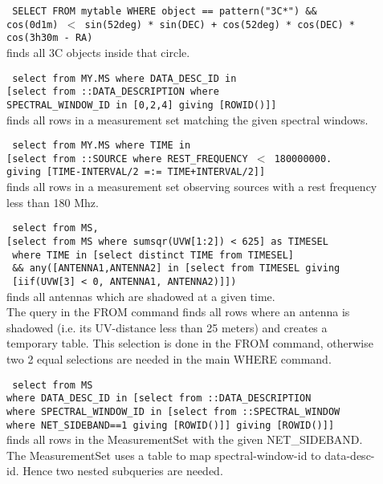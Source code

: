 \begin{description}
  \item[] \texttt{ SELECT FROM mytable WHERE object == pattern("3C*") \&\&}
     \\\texttt{cos(0d1m) $<$ sin(52deg) * sin(DEC) + cos(52deg) *
        cos(DEC) * cos(3h30m - RA) }
     \\finds all 3C objects inside that circle.

  \item[] \texttt{ select from MY.MS where DATA\_DESC\_ID in}
      \\\texttt{[select from ::DATA\_DESCRIPTION where}
      \\\texttt{SPECTRAL\_WINDOW\_ID in [0,2,4] giving [ROWID()]]}
      \\finds all rows in a measurement set matching the given
      spectral windows.

  \item[] \texttt{ select from MY.MS where TIME in}
      \\\texttt{[select from ::SOURCE where REST\_FREQUENCY $<$ 180000000.}
      \\\texttt{giving [TIME-INTERVAL/2 =:= TIME+INTERVAL/2]]}
      \\finds all rows in a measurement set observing sources with a
      rest frequency less than 180 Mhz.

  \item[] \texttt{ select from MS,}
      \\\texttt{[select from MS where sumsqr(UVW[1:2]) < 625] as TIMESEL}
      \\\texttt{ where TIME in [select distinct TIME from TIMESEL]}
      \\\texttt{   \&\& any([ANTENNA1,ANTENNA2] in [select from TIMESEL giving}
      \\\texttt{                      [iif(UVW[3] < 0, ANTENNA1, ANTENNA2)]])}
      \\finds all antennas which are shadowed at a given time.
      \\The query in the FROM command finds all rows where an antenna
      is shadowed (i.e. its UV-distance less than 25 meters) and
      creates a temporary table. This selection is done in the FROM
      command, otherwise two 2 equal selections are needed in the main
      WHERE command.
      
  \item[] \texttt{ select from MS}
      \\\texttt{where DATA\_DESC\_ID in [select from ::DATA\_DESCRIPTION}
      \\\texttt{where SPECTRAL\_WINDOW\_ID in [select from ::SPECTRAL\_WINDOW}
      \\\texttt{where NET\_SIDEBAND==1 giving [ROWID()]] giving [ROWID()]]}
      \\finds all rows in the MeasurementSet with the given
      NET\_SIDEBAND.
      \\The MeasurementSet uses a table to map spectral-window-id to
      data-desc-id. Hence two nested subqueries are needed.
\end{description}

